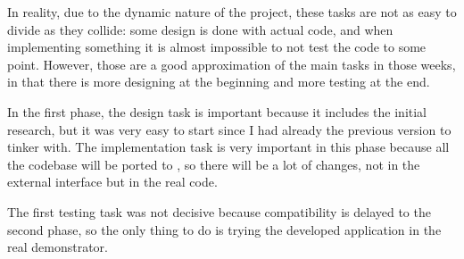 In reality, due to the dynamic nature of the project, these tasks are not as easy to divide as they collide: some design is done with actual code, and when implementing something it is almost impossible to not test the code to some point.
However, those are a good approximation of the main tasks in those weeks, in that there is more designing at the beginning and more testing at the end.

In the first phase, the design task is important because it includes the initial research, but it was very easy to start since I had already the previous version to tinker with.
The implementation task is very important in this phase because all the  codebase will be ported to , so there will be a lot of changes, not in the external interface but in the real code.

The first testing task was not decisive because  compatibility is delayed to the second phase, so the only thing to do is trying the developed application in the real demonstrator.

\begin{landscape}
\addtolength{\headsep}{3cm}
\parbox[c][\textwidth][s]{\linewidth}{%
\vfill
{}
\label{fig:gannt-diagram}%
\vfill
}
\end{landscape}


